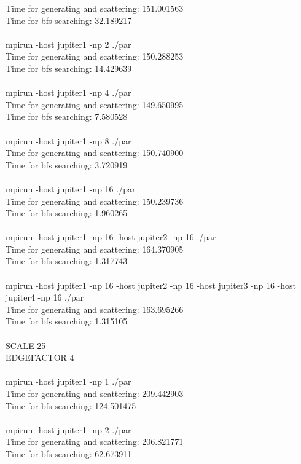 \documentclass[12pt,a4paper]{article}
\begin{document}
Time for generating and scattering: 151.001563\\
Time for bfs searching: 32.189217\\
\\
mpirun -host jupiter1 -np 2 ./par\\
Time for generating and scattering: 150.288253\\
Time for bfs searching: 14.429639\\
\\
mpirun -host jupiter1 -np 4 ./par\\
Time for generating and scattering: 149.650995\\
Time for bfs searching: 7.580528\\
\\
mpirun -host jupiter1 -np 8 ./par\\
Time for generating and scattering: 150.740900\\
Time for bfs searching: 3.720919\\
\\
mpirun -host jupiter1 -np 16 ./par\\
Time for generating and scattering: 150.239736\\
Time for bfs searching: 1.960265\\
\\
mpirun -host jupiter1 -np 16 -host jupiter2 -np 16 ./par\\
Time for generating and scattering: 164.370905\\
Time for bfs searching: 1.317743\\
\\
mpirun -host jupiter1 -np 16 -host jupiter2 -np 16 -host jupiter3 -np 16 -host jupiter4 -np 16 ./par\\
Time for generating and scattering: 163.695266\\
Time for bfs searching: 1.315105\\
\\
SCALE 25\\
EDGEFACTOR 4\\
\\
mpirun -host jupiter1 -np 1 ./par\\
Time for generating and scattering: 209.442903\\
Time for bfs searching: 124.501475\\
\\
mpirun -host jupiter1 -np 2 ./par\\
Time for generating and scattering: 206.821771\\
Time for bfs searching: 62.673911\\
\end{document}
